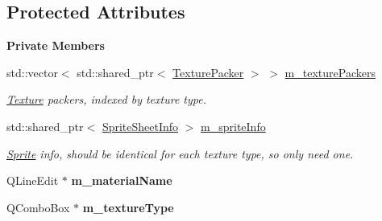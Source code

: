 \subsection*{Protected Attributes}
\begin{Indent}\textbf{ Private Members}\par
\begin{DoxyCompactItemize}
\item 
\mbox{\label{classrev_1_1_view_1_1_sprite_sheet_widget_aa6ff2e5f3e168b8a974a7cf39581e23d}} 
std\+::vector$<$ std\+::shared\+\_\+ptr$<$ \mbox{\hyperlink{classrev_1_1_texture_packer}{Texture\+Packer}} $>$ $>$ \mbox{\hyperlink{classrev_1_1_view_1_1_sprite_sheet_widget_aa6ff2e5f3e168b8a974a7cf39581e23d}{m\+\_\+texture\+Packers}}
\begin{DoxyCompactList}\small\item\em \mbox{\hyperlink{classrev_1_1_texture}{Texture}} packers, indexed by texture type. \end{DoxyCompactList}\item 
\mbox{\label{classrev_1_1_view_1_1_sprite_sheet_widget_a79a662a67ede532d3b35a570a59dfc56}} 
std\+::shared\+\_\+ptr$<$ \mbox{\hyperlink{structrev_1_1_sprite_sheet_info}{Sprite\+Sheet\+Info}} $>$ \mbox{\hyperlink{classrev_1_1_view_1_1_sprite_sheet_widget_a79a662a67ede532d3b35a570a59dfc56}{m\+\_\+sprite\+Info}}
\begin{DoxyCompactList}\small\item\em \mbox{\hyperlink{classrev_1_1_sprite}{Sprite}} info, should be identical for each texture type, so only need one. \end{DoxyCompactList}\item 
\mbox{\label{classrev_1_1_view_1_1_sprite_sheet_widget_ac9862aac1d52cb6851831fabf120174b}} 
Q\+Line\+Edit $\ast$ {\bfseries m\+\_\+material\+Name}
\item 
\mbox{\label{classrev_1_1_view_1_1_sprite_sheet_widget_a39989273d72bef668c895b69da34baa8}} 
Q\+Combo\+Box $\ast$ {\bfseries m\+\_\+texture\+Type}
\item 
\mbox{\label{classrev_1_1_view_1_1_sprite_sheet_widget_acd1e61b05abc876ae502900e6353f11e}} 

\end{DoxyCompactItemize}
\end{Indent}

